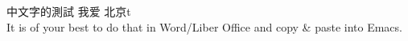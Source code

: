 \documentclass{article}
\begin{document}
中文字的測試 我爱 北京t
\\
It is of your best to do that in Word/Liber Office and copy \& paste
into Emacs.
\end{document}
